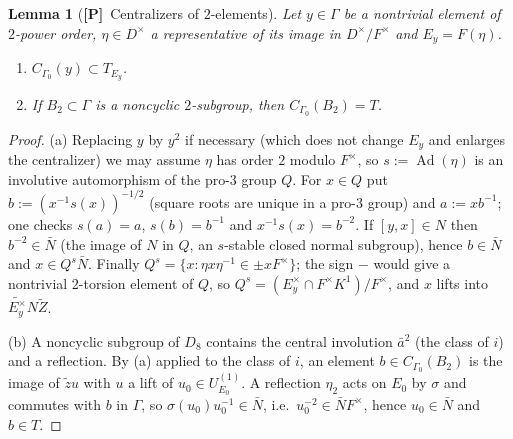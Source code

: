 \documentclass[11pt]{article}
\newcommand{\Ad}{\operatorname{Ad}}
\newcommand{\tZ}{\widetilde Z}
\newcommand{\Ptag}{\textnormal{\textbf{[P]}}}
\theoremstyle{plain}
\newtheorem{lemma}[theorem]{Lemma}
\theoremstyle{definition}
\begin{document}
\begin{lemma}[\Ptag\ Centralizers of $2$-elements]\label{lem:centralizers}
Let $y\in\Gamma$ be a nontrivial element of $2$-power order, $\eta\in D^\times$
a representative of its image in $D^\times/F^\times$ and $E_y=F(\eta)$.
\begin{enumerate}[label=(\alph*)]
\item $C_{\Gamma_0}(y)\subset T_{E_y}$.
\item If $B_2\subset\Gamma$ is a noncyclic $2$-subgroup, then
$C_{\Gamma_0}(B_2)=T$.
\end{enumerate}
\end{lemma}
\begin{proof}
(a) Replacing $y$ by $y^2$ if necessary (which does not change $E_y$ and
enlarges the centralizer) we may assume $\eta$ has order $2$ modulo
$F^\times$, so $s:=\Ad(\eta)$ is an involutive automorphism of the
pro-$3$ group $Q$.  For $x\in Q$ put $b:=(x^{-1}s(x))^{-1/2}$ (square
roots are unique in a pro-$3$ group) and $a:=xb^{-1}$; one checks
$s(a)=a$, $s(b)=b^{-1}$ and $x^{-1}s(x)=b^{-2}$.  If
$[y,x]\in N$ then $b^{-2}\in\bar N$ (the image of $N$ in $Q$, an
$s$-stable closed normal subgroup), hence $b\in\bar N$ and
$x\in Q^s\bar N$.  Finally $Q^s=\{x:\eta x\eta^{-1}\in\pm xF^\times\}$;
the sign $-$ would give a nontrivial $2$-torsion element of $Q$, so
$Q^s=(E_y^\times\cap F^\times K^1)/F^\times$, and $x$ lifts into
$\widetilde{E_y^\times}N\tZ$.

(b) A noncyclic subgroup of $D_8$ contains the central involution
$\bar a^2$ (the class of $i$) and a reflection.  By (a) applied to the
class of $i$, an element $b\in C_{\Gamma_0}(B_2)$ is the image of
$\tilde zu$ with $u$ a lift of $u_0\in U^{(1)}_{E_0}$.  A reflection $\eta_2$
acts on $E_0$ by $\sigma$ and commutes with $b$ in $\Gamma$, so
$\sigma(u_0)u_0^{-1}\in\bar N$, i.e.\ $u_0^{-2}\in\bar N F^\times$,
hence $u_0\in\bar N$ and $b\in T$.
\end{proof}
\end{document}
